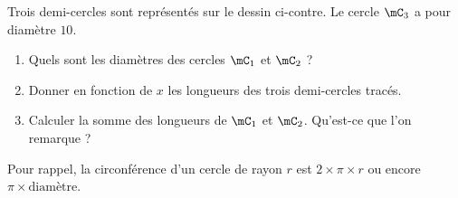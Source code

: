 
\begin{exercice}\label{exo2smath-0156}

%   

    \begin{multicols}{2}
    Trois demi-cercles sont représentés sur le dessin ci-contre. Le cercle \( \mC_3\) a pour diamètre \( 10\).

    \begin{enumerate}
        \item
            Quels sont les diamètres des cercles \( \mC_1\) et \( \mC_2\) ?
        \item
            Donner en fonction de \( x\) les longueurs des trois demi-cercles tracés.
        \item   \label{ItemCUFLooIdJOVd}
            Calculer la somme des longueurs de \( \mC_1\) et \( \mC_2\). Qu'est-ce que l'on remarque ?
    \end{enumerate}

    \columnbreak

    \begin{center}
   
    \end{center}
    \end{multicols}
    Pour rappel, la circonférence d'un cercle de rayon \( r\) est \( 2\times \pi\times r\) ou encore \( \pi\times \text{diamètre}\).

\end{exercice}
